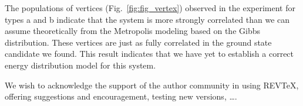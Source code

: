 \documentclass[pre,reprint,superscriptaddress]{revtex4-2}
\begin{document}
The populations of vertices (Fig.~\ref{fig:fig_vertex}) observed in the experiment for types a and b indicate that the system is more strongly correlated than we can assume theoretically from the Metropolis modeling based on the Gibbs~\cite{janke2008monte} distribution. These vertices are just as fully correlated in the ground state candidate we found. This result indicates that we have yet to establish a correct energy distribution model for this system.

\begin{acknowledgments}
We wish to acknowledge the support of the author community in using
REV\TeX{}, offering suggestions and encouragement, testing new versions,
\dots.
\end{acknowledgments}

\nocite{*}
\end{document}

